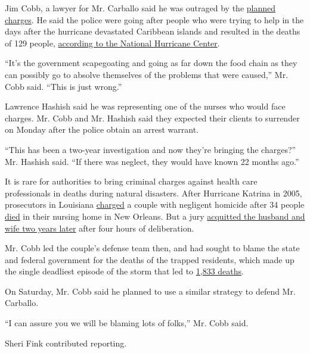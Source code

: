 Jim Cobb, a lawyer for Mr. Carballo said he was outraged by the
\href{https://www.sun-sentinel.com/local/broward/hollywood/fl-ne-arrests-tip-hollywood-nursing-home-deaths-20190824-743bjqf63fchdbcvunctelb6uq-story.html?outputType=amp}{planned
charges}. He said the police were going after people who were trying to
help in the days after the hurricane devastated Caribbean islands and
resulted in the deaths of 129 people,
\href{https://www.nhc.noaa.gov/data/tcr/AL112017_Irma.pdf}{according to
the National Hurricane Center}.

``It's the government scapegoating and going as far down the food chain
as they can possibly go to absolve themselves of the problems that were
caused,'' Mr. Cobb said. ``This is just wrong.''

Lawrence Hashish said he was representing one of the nurses who would
face charges. Mr. Cobb and Mr. Hashish said they expected their clients
to surrender on Monday after the police obtain an arrest warrant.

``This has been a two-year investigation and now they're bringing the
charges?'' Mr. Hashish said. ``If there was neglect, they would have
known 22 months ago.''

It is rare for authorities to bring criminal charges against health care
professionals in deaths during natural disasters. After Hurricane
Katrina in 2005, prosecutors in Louisiana
\href{https://www.nytimes.com/2005/09/14/us/nationalspecial/owners-of-nursing-home-charged-in-deaths-of-34.html}{charged}
a couple with negligent homicide after 34 people
\href{https://www.nytimes.com/2005/09/07/us/nationalspecial/in-nursing-home-a-fight-lost-to-rising-waters.html}{died}
in their nursing home in New Orleans. But a jury
\href{https://www.nytimes.com/2007/09/08/us/nationalspecial/08nursing.html}{acquitted
the husband and wife two years later} after four hours of deliberation.

Mr. Cobb led the couple's defense team then, and had sought to blame the
state and federal government for the deaths of the trapped residents,
which made up the single deadliest episode of the storm that led to
\href{https://www.nhc.noaa.gov/data/tcr/AL122005_Katrina.pdf}{1,833
deaths}.

On Saturday, Mr. Cobb said he planned to use a similar strategy to
defend Mr. Carballo.

``I can assure you we will be blaming lots of folks,'' Mr. Cobb said.

Sheri Fink contributed reporting.

